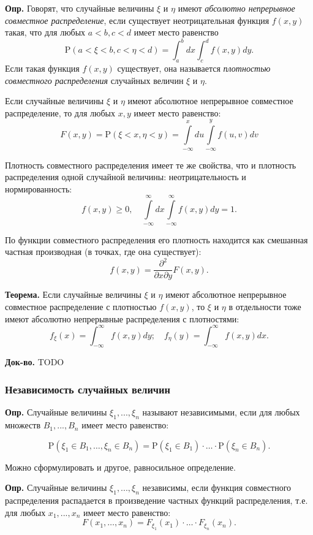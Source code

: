 \documentclass[oneside,final,14pt]{extreport}
\newcommand\mydef{{\bf Опр.}}
\newcommand\myth{{\bf Теорема.}}
\newcommand\myqed{{\bf Док-во.}}
\theoremstyle{definition}
\begin{document}
\mydef{} Говорят, что случайные величины $\xi$ и $\eta$ имеют {\it абсолютно непрерывное совместное распределение}, если существует неотрицательная функция $f(x,y)$ такая, что для любых $a < b, c < d$ имеет место равенство
$$\mathrm{P}(a<\xi<b, c<\eta<d)=\int_{a}^{b} d x \int_{c}^{d} f(x, y) d y.$$
Если такая функция $f(x,y)$ существует, она называется {\it плотностью совместного распределения} случайных величин $\xi$ и $\eta$.

Если случайные величины $\xi$ и $\eta$ имеют абсолютное непрерывное совместное распределение, то для любых $x, y$ имеет место равенство:
\begin{equation}F(x, y)=\mathrm{P}(\xi<x, \eta<y)=\int\limits_{-\infty}^{x} d u \int\limits_{-\infty}^{y} f(u, v) d v\end{equation}

Плотность совместного распределения имеет те же свойства, что и плотность распределения одной случайной величины: неотрицательность и нормированность:
$$f(x, y) \geqslant 0, \quad \int\limits_{-\infty}^{\infty} d x \int\limits_{-\infty}^{\infty} f(x, y) d y=1.$$

По функции совместного распределения его плотность находится как смешанная частная производная (в точках, где она существует):
$$f(x, y)=\frac{\partial^{2}}{\partial x \partial y} F(x, y).$$

\myth{} Если случайные величины $\xi$ и $\eta$ имеют абсолютное непрерывное совместное распределение с плотностью $f(x,y)$, то $\xi$ и $\eta$ в отдельности тоже имеют абсолютно непрерывные распределения с плотностями:
$$f_{\xi}(x)=\int_{-\infty}^{\infty} f(x, y) d y ; \quad f_{\eta}(y)=\int_{-\infty}^{\infty} f(x, y) d x.$$

\myqed{} TODO

\subsubsection{Независимость случайных величин}

\mydef{} Случайные величины $\xi_1, ..., \xi_n$ называют независимыми, если для любых множеств $B_1, ..., B_n$ имеет место равенство:

$$\mathrm{P}\left(\xi_{1} \in B_{1}, \ldots, \xi_{n} \in B_{n}\right)=\mathrm{P}\left(\xi_{1} \in B_{1}\right) \cdot \ldots \cdot \mathrm{P}\left(\xi_{n} \in B_{n}\right).$$

Можно сформулировать и другое, равносильное определение.

\mydef{} Случайные величины $\xi_1, ..., \xi_n$ независимы, если функция совместного распределения распадается в произведение частных функций распределения, т.е. для любых $x_1, ..., x_n$ имеет место равенство:
$$F\left(x_{1}, \ldots, x_{n}\right)=F_{\xi_{1}}\left(x_{1}\right) \cdot \ldots \cdot F_{\xi_{n}}\left(x_{n}\right).$$
\end{document}
